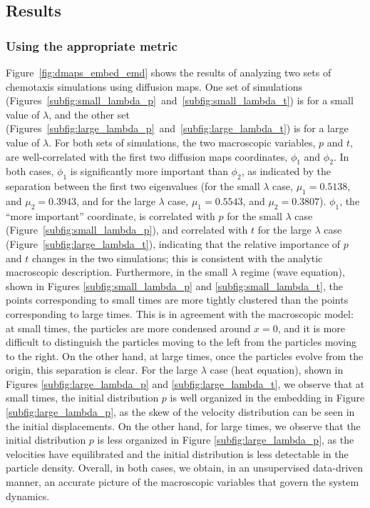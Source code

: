 \documentclass[preprint]{elsarticle}
\begin{document}
\subsection{Results}


\subsubsection{Using the appropriate metric}


Figure~\ref{fig:dmaps_embed_emd} shows the results of analyzing two sets of chemotaxis simulations using diffusion maps. 
%
One set of simulations (Figures~\ref{subfig:small_lambda_p}~and~\ref{subfig:small_lambda_t}) is for a small value of $\lambda$, and the other set (Figures~\ref{subfig:large_lambda_p}~and~\ref{subfig:large_lambda_t}) is for a large value of $\lambda$. 
%
For both sets of simulations, the two macroscopic variables, $p$ and $t$, are well-correlated with the first two diffusion maps coordinates, $\phi_1$ and $\phi_2$. 
%
In both cases, $\phi_1$ is significantly more important than $\phi_2$, as indicated by the separation between the first two eigenvalues (for the small $\lambda$ case, $\mu_1 = 0.5138$, and $\mu_2 = 0.3943$, and for the large $\lambda$ case, $\mu_1 = 0.5543$, and $\mu_2 = 0.3807$).
%
$\phi_1$, the ``more important'' coordinate, is correlated with $p$ for the small $\lambda$ case (Figure~\ref{subfig:small_lambda_p}), and correlated with $t$ for the large $\lambda$ case (Figure~\ref{subfig:large_lambda_t}), indicating that the relative importance of $p$ and $t$ changes in the two simulations;
this is consistent with the analytic macroscopic description. 
%
Furthermore, in the small $\lambda$ regime (wave equation), shown in Figures \ref{subfig:small_lambda_p} and \ref{subfig:small_lambda_t}, the points corresponding to small times are more tightly clustered than the points corresponding to large times.
%
This is in agreement with the macroscopic model: at small times, the particles are more condensed around $x=0$, and it is more difficult to distinguish the particles moving to the left from the particles moving to the right. 
%
On the other hand, at large times, once the particles evolve from the origin, this separation is clear.  
%
For the large $\lambda$ case (heat equation), shown in Figures \ref{subfig:large_lambda_p} and \ref{subfig:large_lambda_t}, we observe that at small times, the initial distribution $p$ is well organized in the embedding in Figure \ref{subfig:large_lambda_p}, as the skew of the velocity distribution can be seen in the initial displacements.
%
On the other hand, for large times, we observe that the initial distribution $p$ is less organized in Figure \ref{subfig:large_lambda_p}, as the velocities have equilibrated and the initial distribution is less detectable in the particle density.
%
Overall, in both cases, we obtain, in an unsupervised data-driven manner, an accurate picture of the macroscopic variables that govern the system dynamics.
\end{document}
